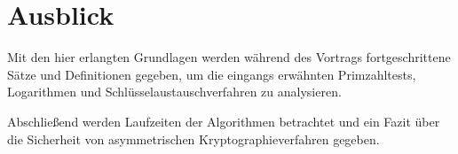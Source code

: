 \section*{Ausblick}\label{Kapitel Fazit}
	\wup Mit den hier erlangten Grundlagen werden während des Vortrags fortgeschrittene Sätze und Definitionen gegeben, um die eingangs erwähnten Primzahltests, Logarithmen und Schlüsselaustauschverfahren zu analysieren.

	\wup Abschließend werden Laufzeiten der Algorithmen betrachtet und ein Fazit über die Sicherheit von asymmetrischen Kryptographieverfahren gegeben.